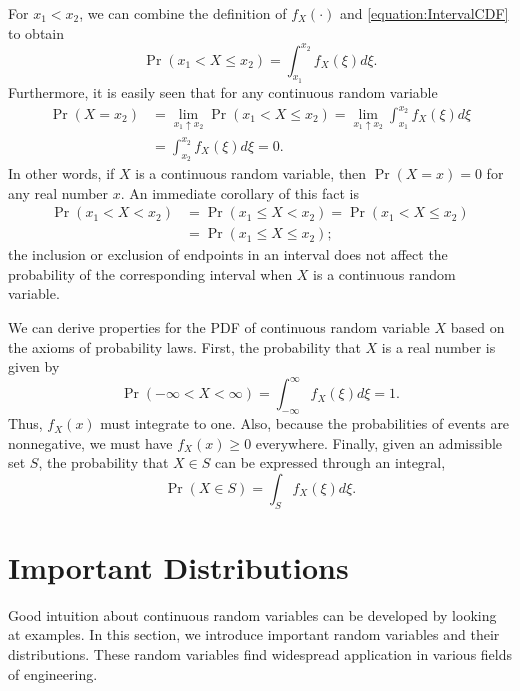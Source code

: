 For $x_1 < x_2$, we can combine the definition of $f_X(\cdot)$ and \eqref{equation:IntervalCDF} to obtain
\begin{equation*}
\Pr (x_1 < X \leq x_2) = \int_{x_1}^{x_2} f_X (\xi) d\xi .
\end{equation*}
Furthermore, it is easily seen that for any continuous random variable
\begin{equation*}
\begin{split}
\Pr (X = x_2) &= \lim_{x_1 \uparrow x_2} \Pr (x_1 < X \leq x_2)
= \lim_{x_1 \uparrow x_2} \int_{x_1}^{x_2} f_X (\xi) d\xi \\
&= \int_{x_2}^{x_2} f_X (\xi) d\xi = 0.
\end{split}
\end{equation*}
In other words, if $X$ is a continuous random variable, then $\Pr (X = x) = 0$ for any real number $x$.
An immediate corollary of this fact is
\begin{equation*}
\begin{split}
\Pr (x_1 < X < x_2)
&= \Pr (x_1 \leq X < x_2)
= \Pr (x_1 < X \leq x_2) \\
&= \Pr (x_1 \leq X \leq x_2) ;
\end{split}
\end{equation*}
the inclusion or exclusion of endpoints in an interval does not affect the probability of the corresponding interval when $X$ is a continuous random variable.

We can derive properties for the PDF of continuous random variable $X$ based on the axioms of probability laws.
First, the probability that $X$ is a real number is given by
\begin{equation*}
\Pr (-\infty < X < \infty) = \int_{-\infty}^{\infty} f_X (\xi) d\xi = 1.
\end{equation*}
Thus, $f_X (x)$ must integrate to one.
Also, because the probabilities of events are nonnegative, we must have $f_X (x) \geq 0$ everywhere.
Finally, given an admissible set $S$, the probability that $X \in S$ can be expressed through an integral,
\begin{equation*}
\Pr (X \in S) = \int_S f_X (\xi) d\xi .
\end{equation*}


\section{Important Distributions}

Good intuition about continuous random variables can be developed by looking at examples.
In this section, we introduce important random variables and their distributions.
These random variables find widespread application in various fields of engineering.


